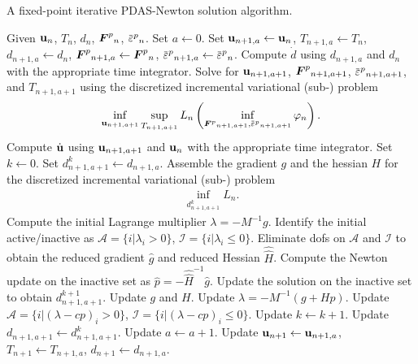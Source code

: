 \begin{algorithm}[!htb]
  \small
  \caption{A fixed-point iterative PDAS-Newton solution algorithm. }
  \begin{algorithmic}[1]
    \State Given $\textbf{u}_n$, $T_n$, $d_n$, ${\boldsymbol{F}^p}_n$, $\ep_n$.
    \State Set $a \leftarrow 0$.
    \State Set $\textbf{u}_{n+1,a} \leftarrow \textbf{u}_n$, $T_{n+1,a} \leftarrow T_n$, $d_{n+1,a} \leftarrow d_n$, ${\boldsymbol{F}^p}_{n+1,a} \leftarrow {\boldsymbol{F}^p}_n$, $\ep_{n+1,a} \leftarrow \ep_n$.
    \Repeat
    \State Compute $\dot{d}$ using $d_{n+1,a}$ and $d_n$ with the appropriate time integrator.
    \State Solve for $\textbf{u}_{n+1,a+1}$, ${\boldsymbol{F}^p}_{n+1,a+1}$, $\ep_{n+1,a+1}$, and $T_{n+1,a+1}$ using the discretized incremental variational (sub-) problem
    \begin{align*}
      \inf_{\btu_{n+1,a+1}} \sup_{T_{n+1,a+1}} L_n\left( \inf_{{\defgrad^p}_{n+1,a+1}, \ep_{n+1,a+1}} \varphi_n \right).
    \end{align*}
    \State Compute $\dot{\textbf{u}}$ using $\textbf{u}_{n+1,a+1}$ and $\textbf{u}_n$ with the appropriate time integrator.
    \State Set $k \leftarrow 0$.
    \State Set $d_{n+1,a+1}^k \leftarrow d_{n+1,a}$.
    \State Assemble the gradient $g$ and the hessian $H$ for the discretized incremental variational (sub-) problem
    \begin{align*}
      \inf_{d_{n+1,a+1}^k} L_n.
    \end{align*}
    \State Compute the initial Lagrange multiplier $\lambda = -M^{-1}g$.
    \State Identify the initial active/inactive as $\mathcal{A} = \{ i \vert \lambda_i > 0 \}$, $\mathcal{I} = \{ i \vert \lambda_i \leqslant 0 \}$.
    \Repeat
    \State Eliminate dofs on $\mathcal{A}$ and $\mathcal{I}$ to obtain the reduced gradient $\widehat{g}$ and reduced Hessian $\widehat{\widehat{H}}$.
    \State Compute the Newton update on the inactive set as $\widehat{p} = - \widehat{\widehat{H}}^{-1} \widehat{g}$.
    \State Update the solution on the inactive set to obtain $d_{n+1,a+1}^{k+1}$.
    \State Update $g$ and $H$.
    \State Update $\lambda = -M^{-1}(g+Hp)$.
    \State Update $\mathcal{A} = \{ i \vert (\lambda-cp)_i > 0 \}$, $\mathcal{I} = \{ i \vert (\lambda-cp)_i \leqslant 0 \}$.
    \State Update $k \leftarrow k+1$.
    \State Update $d_{n+1,a+1} \leftarrow d_{n+1,a+1}^k$.
    \State Update $a \leftarrow a+1$.
    \State Update $\textbf{u}_{n+1} \leftarrow \textbf{u}_{n+1,a}$, $T_{n+1} \leftarrow T_{n+1,a}$, $d_{n+1} \leftarrow d_{n+1,a}$.
  \end{algorithmic}
  \label{alg: PDAS-newton}
\end{algorithm}
